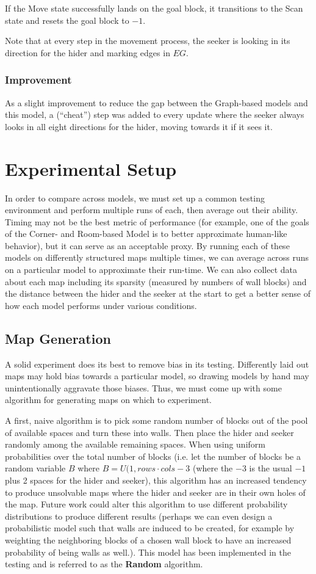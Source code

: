 \documentclass[12pt]{article}
\begin{document}
If the Move state successfully lands on the goal block, it transitions to the Scan state and resets the goal block to $ -1 $.

Note that at every step in the movement process, the seeker is looking in its direction for the hider and marking edges in $ EG $.

\subsubsection{Improvement}
As a slight improvement to reduce the gap between the Graph-based models and this model, a (``cheat'') step was added to every update where the seeker always looks in all eight directions for the hider, moving towards it if it sees it. 

\section{Experimental Setup} \label{Experiments}
In order to compare across models, we must set up a common testing environment and perform multiple runs of each, then average out their ability. Timing may not be the best metric of performance (for example, one of the goals of the Corner- and Room-based Model is to better approximate human-like behavior), but it can serve as an acceptable proxy. By running each of these models on differently structured maps multiple times, we can average across runs on a particular model to approximate their run-time. We can also collect data about each map including its sparsity (measured by numbers of wall blocks) and the distance between the hider and the seeker at the start to get a better sense of how each model performs under various conditions.

\subsection{Map Generation}
A solid experiment does its best to remove bias in its testing. Differently laid out maps may hold bias towards a particular model, so drawing models by hand may unintentionally aggravate those biases. Thus, we must come up with some algorithm for generating maps on which to experiment. 

A first, naive algorithm is to pick some random number of blocks out of the pool of available spaces and turn these into walls. Then place the hider and seeker randomly among the available remaining spaces. When using uniform probabilities over the total number of blocks (i.e. let the number of blocks be a random variable $ B $ where $ B = U(1, rows \cdot cols - 3 $ (where the $ - 3 $ is the usual $ - 1 $ plus 2 spaces for the hider and  seeker), this algorithm has an increased tendency to produce unsolvable maps where the hider and seeker are in their own holes of the map. Future work could alter this algorithm to use different probability distributions to produce different results (perhaps we can even design a probabilistic model such that walls are induced to be created, for example by weighting the neighboring blocks of a chosen wall block to have an increased probability of being walls as well.). This model has been implemented in the testing and is referred to as the \textbf{Random} algorithm.
\end{document}
